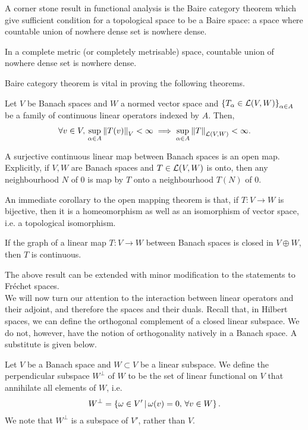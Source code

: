 \documentclass{article}
\begin{document}
A corner stone result in functional analysis is the Baire category theorem which give sufficient condition for a topological space to be a Baire space: a space where countable union of nowhere dense set is nowhere dense. 
\begin{ftheorem} In a complete metric (or completely metrisable) space, countable union of nowhere dense set is nowhere dense. 
\end{ftheorem}

Baire category theorem is vital in proving the following theorems. 
\begin{ftheorem} Let $V$ be Banach spaces and $W$ a normed vector space and $\set{T_\alpha \in \L(V, W)}_{\alpha \in A}$ be a family of continuous linear operators indexed by $A$. Then, 
\begin{align*}
\forall v \in V, \, \sup_{\alpha \in A} \norm[T(v)]_V < \infty \implies \sup_{\alpha \in A} \norm[T]_{\L(V, W)} < \infty. 
\end{align*}
\end{ftheorem}

\begin{ftheorem} A surjective continuous linear map between Banach spaces is an open map. Explicitly, if $V, W$ are Banach spaces and $T \in \L(V, W)$ is onto, then any neighbourhood $N$ of $0$ is map by $T$ onto a neighbourhood $T(N)$ of $0$. 
\end{ftheorem}
An immediate corollary to the open mapping theorem is that, if $T: V \to W$ is bijective, then it is a homeomorphism as well as an isomorphism of vector space, i.e. a topological isomorphism. 

\begin{ftheorem} If the graph of a linear map $T: V \to W$ between Banach spaces is closed in $V \oplus W$, then $T$ is continuous. 
\end{ftheorem}
The above result can be extended with minor modification to the statements to Fr\'echet spaces. \\

We will now turn our attention to the interaction between linear operators and their adjoint, and therefore the spaces and their duals. Recall that, in Hilbert spaces, we can define the orthogonal complement of a closed linear subspace. We do not, however, have the notion of orthogonality natively in a Banach space. A substitute is given below. 
\begin{fdefinition} Let $V$ be a Banach space and $W \subset V$ be a linear subspace. We define the perpendicular subspace $W^\perp$ of $W$ to be the set of linear functional on $V$ that annihilate all elements of $W$, i.e. 
\begin{align*}
W^\perp = \set{ \omega \in V' \wh \omega(v) = 0, \, \forall v \in W}.
\end{align*}
We note that $W^\perp$ is a subspace of $V'$, rather than $V$. 
\end{fdefinition}
\end{document}
